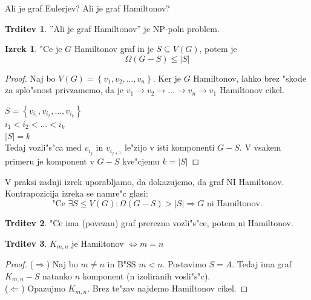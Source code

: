 \documentclass{article}
\theoremstyle{definition}
\newtheorem{claim}{Trditev}[section]
\newtheorem{theorem}{Izrek}[section]
\begin{document}
	Ali je graf Eulerjev? Ali je graf Hamiltonov?
	\begin{claim}
		''Ali je graf Hamiltonov'' je NP-poln problem. %
	\end{claim}

	\begin{theorem}
		"Ce je $G$ Hamiltonov graf in je $S \subseteq V(G)$, potem je
		$$\Omega(G-S) \leq |S|$$
		\begin{proof}
			Naj bo $V(G) = \left\lbrace v_1, v_2, \ldots, v_n \right\rbrace $. Ker je $G$ Hamiltonov, lahko brez "skode za splo"snost privzamemo, da je $v_1 \rightarrow v_2 \rightarrow ... \rightarrow v_n \rightarrow v_1 $ Hamiltonov cikel. 
			
			$S = \left\lbrace v_{i_1}, v_{i_2}, \ldots, v_{i_k} \right\rbrace $ \\
			$ i_1 < i_2 < \ldots < i_k $ \\
			$|S| = k$ \\
			Tedaj vozli"s"ca med $v_{i_j}$ in $v_{i_{j+1}}$ le"zijo v isti komponenti $G-S$.
			V vsakem primeru je komponent v $G-S$ kve"cjemu $k=|S|$
		\end{proof}
	\end{theorem}

	V praksi zadnji izrek uporabljamo, da dokazujemo, da graf NI Hamiltonov. Kontrapozicija izreka se namre"c glasi: 
	$$ \text{"Ce } \exists S \leq V(G): \Omega(G-S) > |S| \Rightarrow G \text{ ni Hamiltonov.}$$
	
	\begin{claim}
		"Ce ima (povezan) graf prerezno vozli"s"ce, potem ni Hamiltonov.
	\end{claim}
	\begin{claim}
		$ K_{m,n} $ je Hamiltonov $ \iff m=n $
		\begin{proof}
			($\Rightarrow$) Naj bo $m \neq n$ in B"SS $m < n$. Postavimo $S=A$. Tedaj ima graf $K_{m,n}-S$ natanko $n$ komponent (n izoliranih vosli"s"c). \\
			($\Leftarrow$)  Opazujmo $K_{m,n}$. Brez te"zav najdemo Hamiltonov cikel.
		\end{proof}
	\end{claim}
\end{document}
